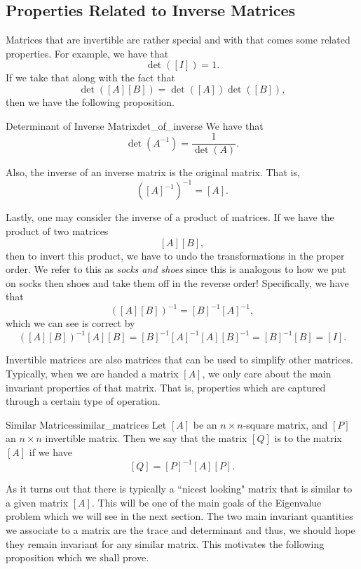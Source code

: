         \subsection{Properties Related to Inverse Matrices}
        Matrices that are invertible are rather special and with that comes some related properties. For example, we have that
        \[
        \det([I])=1.
        \]
        If we take that along with the fact that
        \[
        \det([A][B])=\det([A])\det([B]),
        \]
        then we have the following proposition.
        
        \begin{prop}{Determinant of Inverse Matrix}{det_of_inverse}
        We have that
        \[
        \det(A^{-1})=\frac{1}{\det(A)}.
        \]
        \end{prop}
        
        Also, the inverse of an inverse matrix is the original matrix.  That is, 
        \[
        \left([A]^{-1}\right)^{-1} = [A].
        \]
        
        Lastly, one may consider the inverse of a product of matrices.  If we have the product of two matrices
        \[
        [A][B],
        \]
        then to invert this product, we have to undo the transformations in the proper order. We refer to this as \emph{socks and shoes} since this is analogous to how we put on socks then shoes and take them off in the reverse order! Specifically, we have that
        \[
        ([A][B])^{-1}=[B]^{-1}[A]^{-1},
        \]
        which we can see is correct by
        \[
        ([A][B])^{-1}[A][B] = [B]^{-1}[A]^{-1}[A][B]^{-1} = [B]^{-1}[B]=[I].
        \]
        
        Invertible matrices are also matrices that can be used to simplify other matrices.  Typically, when we are handed a matrix $[A]$, we only care about the main invariant properties of that matrix. That is, properties which are captured through a certain type of operation.  
        
        \begin{df}{Similar Matrices}{similar_matrices}
        Let $[A]$ be an $n\times n$-square matrix, and $[P]$ an $n\times n$ invertible matrix. Then we say that the matrix $[Q]$ is  to the matrix $[A]$ if we have
        \[
        [Q]=[P]^{-1}[A][P].
        \]
        \end{df}
        
        As it turns out that there is typically a ``nicest looking" matrix that is similar to a given matrix $[A]$.  This will be one of the main goals of the Eigenvalue problem which we will see in the next section.  The two main invariant quantities we associate to a matrix are the trace and determinant and thus, we should hope they remain invariant for any similar matrix. This motivates the following proposition which we shall prove.
        
